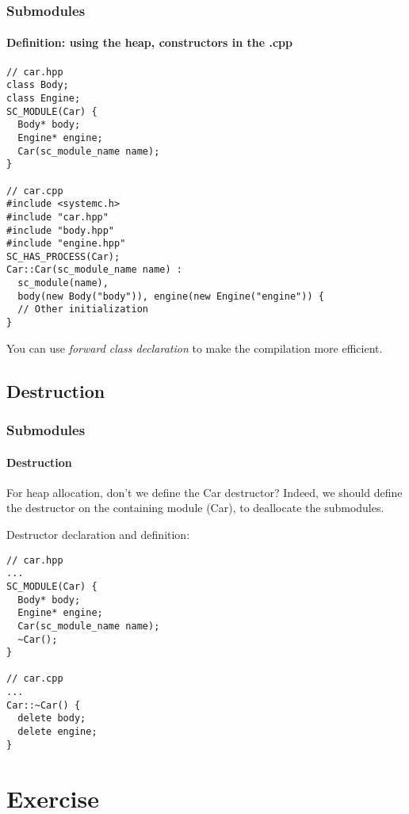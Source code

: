 \begin{frame}[fragile]
\frametitle{Submodules}
\framesubtitle{Definition: using the heap, constructors in the .cpp}

{\scriptsize
\vspace{-0.5em}
\begin{verbatim}
// car.hpp
class Body;
class Engine;
SC_MODULE(Car) {
  Body* body;
  Engine* engine;
  Car(sc_module_name name);
}

// car.cpp
#include <systemc.h>
#include "car.hpp"
#include "body.hpp"
#include "engine.hpp"
SC_HAS_PROCESS(Car);
Car::Car(sc_module_name name) : 
  sc_module(name), 
  body(new Body("body")), engine(new Engine("engine")) {
  // Other initialization
}
\end{verbatim}
You can use {\em forward class declaration} to make the compilation more efficient.
}
\end{frame}

\subsection{Destruction}

\begin{frame}[fragile]
\frametitle{Submodules}
\framesubtitle{Destruction}

{\scriptsize
\begin{block}{{\small For heap allocation, don't we define the Car destructor?}}
Indeed, we should define the destructor on the containing module (Car), to deallocate the submodules.
\end{block}
\pause
\begin{block}{{\small Destructor declaration and definition:}}
\vspace{-1em}
\begin{verbatim}
// car.hpp
...
SC_MODULE(Car) {
  Body* body;
  Engine* engine;
  Car(sc_module_name name);
  ~Car();
}

// car.cpp
...
Car::~Car() {
  delete body;
  delete engine;
}
\end{verbatim}
\vspace{-1em}
\end{block}
}
\end{frame}

\section{Exercise}

